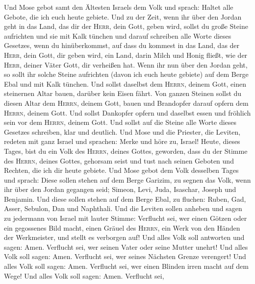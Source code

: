  Und Mose gebot samt den Ältesten Israels dem Volk und
sprach: Haltet alle Gebote, die ich euch heute gebiete. 
Und zu der Zeit, wenn ihr über den Jordan geht in das Land, das dir der
\textsc{Herr}, dein Gott, geben wird, sollst du große Steine aufrichten
und sie mit Kalk tünchen  und darauf schreiben alle Worte
dieses Gesetzes, wenn du hinüberkommst, auf dass du kommest in das Land,
das der \textsc{Herr}, dein Gott, dir geben wird, ein Land, darin Milch
und Honig fließt, wie der \textsc{Herr}, deiner Väter Gott, dir
verheißen hat.  Wenn ihr nun über den Jordan geht, so
sollt ihr solche Steine aufrichten (davon ich euch heute gebiete) auf
dem Berge Ebal und mit Kalk tünchen.  Und sollst daselbst
dem \textsc{Herrn}, deinem Gott, einen steinernen Altar bauen, darüber
kein Eisen fährt.  Von ganzen Steinen sollst du diesen
Altar dem \textsc{Herrn}, deinem Gott, bauen und Brandopfer darauf
opfern dem \textsc{Herrn}, deinem Gott.  Und sollst
Dankopfer opfern und daselbst essen und fröhlich sein vor dem
\textsc{Herrn}, deinem Gott.  Und sollst auf die Steine
alle Worte dieses Gesetzes schreiben, klar und deutlich. 
Und Mose und die Priester, die Leviten, redeten mit ganz Israel und
sprachen: Merke und höre zu, Israel! Heute, dieses Tages, bist du ein
Volk des \textsc{Herrn}, deines Gottes, geworden,  dass
du der Stimme des \textsc{Herrn}, deines Gottes, gehorsam seist und tust
nach seinen Geboten und Rechten, die ich dir heute gebiete.
 Und Mose gebot dem Volk desselben Tages und sprach:
 Diese sollen stehen auf dem Berge Garizim, zu segnen das
Volk, wenn ihr über den Jordan gegangen seid; Simeon, Levi, Juda,
Isaschar, Joseph und Benjamin.  Und diese sollen stehen
auf dem Berge Ebal, zu fluchen: Ruben, Gad, Asser, Sebulon, Dan und
Naphthali.  Und die Leviten sollen anheben und sagen zu
jedermann von Israel mit lauter Stimme:  Verflucht sei,
wer einen Götzen oder ein gegossenes Bild macht, einen Gräuel des
\textsc{Herrn}, ein Werk von den Händen der Werkmeister, und stellt es
verborgen auf! Und alles Volk soll antworten und sagen: Amen.
 Verflucht sei, wer seinen Vater oder seine Mutter
unehrt! Und alles Volk soll sagen: Amen.  Verflucht sei,
wer seines Nächsten Grenze verengert! Und alles Volk soll sagen: Amen.
 Verflucht sei, wer einen Blinden irren macht auf dem
Wege! Und alles Volk soll sagen: Amen.  Verflucht sei,
